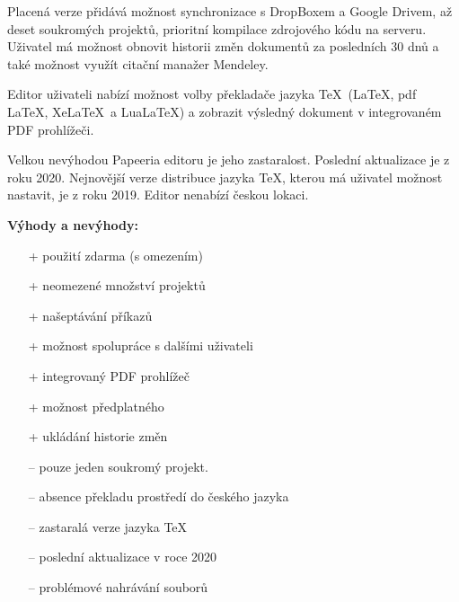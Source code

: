 Placená verze přidává možnost synchronizace s DropBoxem a Google Drivem, až deset soukromých projektů, prioritní kompilace zdrojového kódu na serveru. Uživatel má možnost obnovit historii změn dokumentů za posledních 30 dnů a také možnost využít citační manažer Mendeley. \cite{Papeeriafeatures}

Editor uživateli nabízí možnost volby překladače jazyka \TeX\ (\LaTeX, pdf \LaTeX, Xe\LaTeX\ a Lua\LaTeX) a zobrazit výsledný dokument v integrovaném PDF prohlížeči.  \cite{Papeeria}

Velkou nevýhodou Papeeria editoru je jeho zastaralost. Poslední aktualizace je z roku 2020. Nejnovější verze distribuce jazyka \TeX, kterou má uživatel možnost nastavit, je z roku 2019. Editor nenabízí českou lokaci. \cite{Papeeria}

\textbf{Výhody a nevýhody:}
\begin{multicols}{2}
	\begin{itemize}
		\item [+] použití zdarma (s omezením)
		\item [+] neomezené množství projektů
		\item [+] našeptávání příkazů
		\item [+] možnost spolupráce s dalšími uživateli
		\item [+] integrovaný PDF prohlížeč
		\item [+] možnost předplatného
		\item [+] ukládání historie změn
	\columnbreak
		\item [--] pouze jeden soukromý projekt.
		\item [--] absence překladu prostředí do českého jazyka
		\item [--] zastaralá verze jazyka \TeX
		\item [--] poslední aktualizace v roce 2020
		\item [--] problémové nahrávání souborů
	\end{itemize}
\end{multicols}

